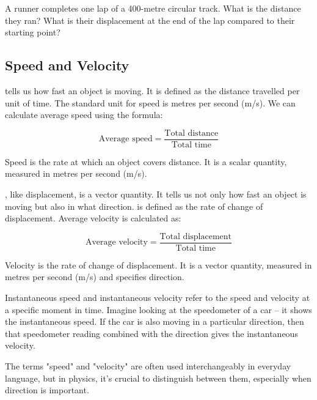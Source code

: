 \begin{stopandthink}
A runner completes one lap of a 400-metre circular track. What is the distance they ran? What is their displacement at the end of the lap compared to their starting point?
\end{stopandthink}

\subsection{Speed and Velocity}

 tells us how fast an object is moving. It is defined as the distance travelled per unit of time.  The standard unit for speed is metres per second (m/s). We can calculate average speed using the formula:

\[ \text{Average speed} = \frac{\text{Total distance}}{\text{Total time}} \]

\begin{keyconcept}{Speed}
 is the rate at which an object covers distance. It is a scalar quantity, measured in metres per second (m/s).
\end{keyconcept}

, like displacement, is a vector quantity. It tells us not only how fast an object is moving but also in what direction.   is defined as the rate of change of displacement.  Average velocity is calculated as:

\[ \text{Average velocity} = \frac{\text{Total displacement}}{\text{Total time}} \]

\begin{keyconcept}{Velocity}
 is the rate of change of displacement. It is a vector quantity, measured in metres per second (m/s) and specifies direction.
\end{keyconcept}

Instantaneous speed and instantaneous velocity refer to the speed and velocity at a specific moment in time.  Imagine looking at the speedometer of a car – it shows the instantaneous speed. If the car is also moving in a particular direction, then that speedometer reading combined with the direction gives the instantaneous velocity.

\begin{marginnote}
The terms "speed" and "velocity" are often used interchangeably in everyday language, but in physics, it's crucial to distinguish between them, especially when direction is important.
\end{marginnote}

